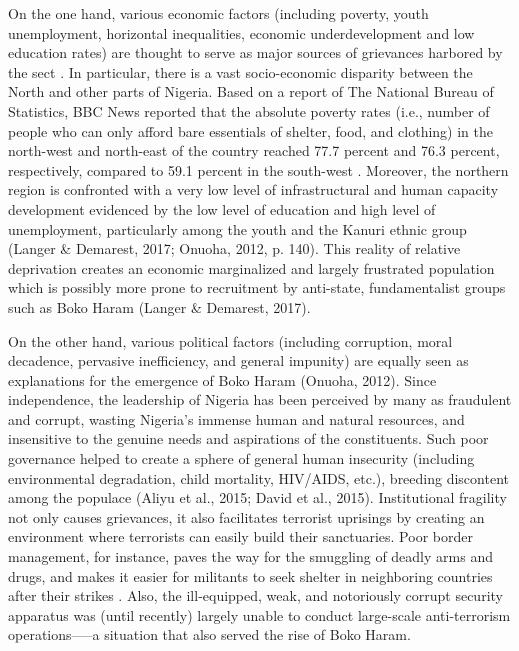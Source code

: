 On the one hand, various economic factors (including poverty, youth unemployment, horizontal inequalities, economic underdevelopment and low education rates) are thought to serve as major sources of grievances harbored by the sect \citep{Aghedo2012, David2015e}. In particular, there is a vast socio-economic disparity between the North and other parts of Nigeria. Based on a report of The National Bureau of Statistics, BBC News reported that the absolute poverty rates (i.e., number of people who can only afford bare essentials of shelter, food, and clothing) in the north-west and north-east of the country reached 77.7 percent and 76.3 percent, respectively, compared to 59.1 percent in the south-west \citep{BBCNews2012}. Moreover, the northern region is confronted with a very low level of infrastructural and human capacity development evidenced by the low level of education and high level of unemployment, particularly among the youth and the Kanuri ethnic group (Langer \& Demarest, 2017; Onuoha, 2012, p. 140). This reality of relative deprivation creates an economic marginalized and largely frustrated population which is possibly more prone to recruitment by anti-state, fundamentalist groups such as Boko Haram (Langer \& Demarest, 2017). 

On the other hand, various political factors (including corruption, moral decadence, pervasive inefficiency, and general impunity) are equally seen as explanations for the emergence of Boko Haram (Onuoha, 2012). Since independence, the leadership of Nigeria has been perceived by many as fraudulent and corrupt, wasting Nigeria’s immense human and natural resources, and insensitive to the genuine needs and aspirations of the constituents. Such poor governance helped to create a sphere of general human insecurity (including environmental degradation, child mortality, HIV/AIDS, etc.), breeding discontent among the populace (Aliyu et al., 2015; David et al., 2015). Institutional fragility not only causes grievances, it also facilitates terrorist uprisings by creating an environment where terrorists can easily build their sanctuaries. Poor border management, for instance, paves the way for the smuggling of deadly arms and drugs, and makes it easier for militants to seek shelter in neighboring countries after their strikes \citep{Khan2015}. Also, the ill-equipped, weak, and notoriously corrupt security apparatus was (until recently) largely unable to conduct large-scale anti-terrorism operations--—a situation that also served the rise of Boko Haram.

